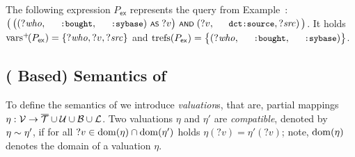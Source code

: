 \begin{example} \label{Example:SPARQLplusExpression}
		The following {\SPARQLplus} expression $P_\mathsf{ex}$ represents the query from Example~:
		$\bigl( \, \bigl( (?\mathit{who},\mathTinyRDF{:bought},\mathTinyRDF{:sybase}) \OpAS ?v \bigr) \OpAND (?v , \mathTinyRDF{dct:source} , ?\mathit{src}) \, \bigr)$.
	It holds $\mathrm{vars}^+\!(P_\mathsf{ex}) = \lbrace ?\mathit{who}, ?v, ?\mathit{src} \rbrace$ and $\fctTRefs{P_\mathsf{ex}} = \big\lbrace (?\mathit{who},\mathTinyRDF{:bought},\mathTinyRDF{:sybase}) \big\rbrace$.
\end{example}


\subsection{({\RDFplus} Based) Semantics of {\SPARQLplus}}
To define the semantics of {\SPARQLplus} we introduce \emph{valuation}s, that are, partial mappings $\eta : \mathcal{V} \rightarrow \overline{\mathcal{T}} \cup \mathcal{U} \cup \mathcal{B} \cup \mathcal{L}$.
Two valuations $\eta$ and $\eta'$ are \emph{compatible}, denoted by $\eta \sim \eta'$, if for all $?v \in \mathrm{dom}(\eta) \cap \mathrm{dom}(\eta')$ holds $\eta(?v) = \eta'(?v)$; note, $\mathrm{dom}(\eta)$ denotes the domain of a valuation $\eta$.

